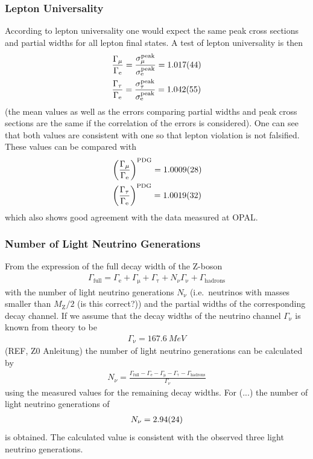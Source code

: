 \documentclass[11pt, a4paper]{article}
\numberwithin{equation}{section}
\newcommand{\korr}[1]{{\color{red}(#1)}}
\begin{document}
\subsubsection{Lepton Universality}
According to lepton universality one would expect the same peak cross sections and partial widths for all lepton final states.
A test of lepton universality is then
\begin{align*}
	&\frac{\Gamma_\mathrm{\mu}}{\Gamma_\mathrm{e}} = \frac{\sigma_\mathrm{\mu}^\mathrm{peak}}{\sigma_\mathrm{e}^\mathrm{peak}} = \num{1.017 +- 0.044}\\
	&\frac{\Gamma_\mathrm{\tau}}{\Gamma_\mathrm{e}} = \frac{\sigma_\mathrm{\tau}^\mathrm{peak}}{\sigma_\mathrm{e}^\mathrm{peak}} = \num{1.042 +- 0.055}\\
\end{align*}
(the mean values as well as the errors comparing partial widths and peak cross sections are the same if the correlation of the errors is considered).
One can see that both values are consistent with one so that lepton violation is not falsified.
These values can be compared with \cite{pdg}
\begin{align*}
	&\left(\frac{\Gamma_\mathrm{\mu}}{\Gamma_\mathrm{e}}\right)^\mathrm{PDG} = \num{1.0009 +- 0.0028} \\
	&\left(\frac{\Gamma_\mathrm{\tau}}{\Gamma_\mathrm{e}}\right)^\mathrm{PDG} = \num{1.0019 +- 0.0032} \\
\end{align*}
which also shows good agreement with the data measured at OPAL. 


\subsubsection{Number of Light Neutrino Generations}
From the expression of the full decay width of the Z-boson
\begin{align*}
	\Gamma_\mathrm{full} = \Gamma_\mathrm{e} + \Gamma_\mathrm{\mu} + \Gamma_\mathrm{\tau} + N_\nu \Gamma_\mathrm{\nu} + \Gamma_\mathrm{hadrons} 
\end{align*}
with the number of light neutrino generations $N_\mathrm{\nu}$ (i.e.\ neutrinos with masses smaller than $M_\mathrm{Z} / 2$ \korr{is this correct?}) and the partial widths of the corresponding decay channel.
If we assume that the decay widths of the neutrino channel $\Gamma_\mathrm{\nu}$ is known from theory to be
\begin{align*}
	\Gamma_\mathrm{\nu} = \SI{167.6}{MeV}
\end{align*}
\korr{REF, Z0 Anleitung} the number of light neutrino generations can be calculated by
\begin{align*}
	N_\nu = \frac{\Gamma_\mathrm{full} - \Gamma_\mathrm{e} - \Gamma_\mathrm{\mu} - \Gamma_\mathrm{\tau} - \Gamma_\mathrm{hadrons}}{\Gamma_\nu}
\end{align*}
using the measured values for the remaining decay widths.
For \korr{...} the number of light neutrino generations of
\begin{align*}
	N_\mathrm{\nu} = \num{2.94 +- 0.24}
\end{align*}
is obtained.
The calculated value is consistent with the observed three light neutrino generations.
\end{document}
